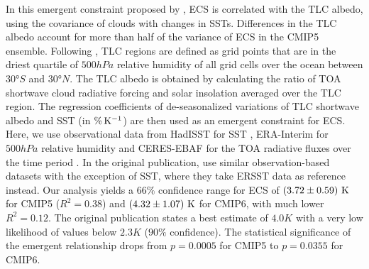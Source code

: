 In this emergent constraint proposed by \textcite{Brient2016}, \ac{ECS} is
correlated with the \ac{TLC} albedo, \ie{} using the covariance of clouds with
changes in \acp{SST}. Differences in the \ac{TLC} albedo account for more than
half of the variance of \ac{ECS} in the \acs{CMIP}5 ensemble. Following
\textcite{Brient2016}, \ac{TLC} regions are defined as grid points that are in
the driest quartile of $500 \unit{hPa}$ relative humidity of all grid cells
over the ocean between $30 \unit{\degree S}$ and $30 \unit{\degree N}$. The
\ac{TLC} albedo is obtained by calculating the ratio of \ac{TOA} shortwave
cloud radiative forcing and solar insolation averaged over the \ac{TLC} region.
The regression coefficients of de-seasonalized variations of \ac{TLC} shortwave
albedo and \ac{SST} (in $\si{\pctK{}}$) are then used as an emergent constraint
for \ac{ECS}. Here, we use observational data from HadISST for \ac{SST}
\autocite{Rayner2003}, ERA-Interim for $500 \unit{hPa}$ relative humidity
\autocite{Dee2011} and CERES-EBAF \autocite{Loeb2018} for the \ac{TOA}
radiative fluxes over the time period . In the original
publication, \textcite{Brient2016} use similar observation-based datasets with
the exception of \ac{SST}, where they take ERSST data \autocite{Smith2003} as
reference instead. Our analysis yields a $66 \unit{\%}$ confidence range for
\ac{ECS} of $\pmrangeunit{3.72}{0.59}{K}$ for \acs{CMIP}5 ($R^2 = 0.38$) and
$\pmrangeunit{4.32}{1.07}{K}$ for \acs{CMIP}6, with much lower $R^2 = 0.12$.
The original publication states a best estimate of $4.0 \unit{K}$ with a very
low likelihood of values below $2.3 \unit{K}$ ($90 \unit{\%}$ confidence). The
statistical significance of the emergent relationship drops from $p = 0.0005$
for \acs{CMIP}5 to $p = 0.0355$ for \acs{CMIP}6.

